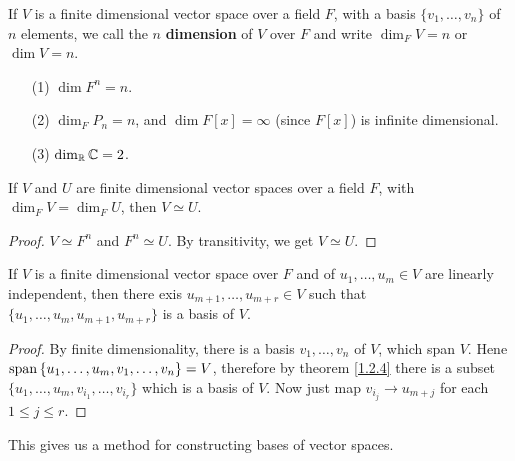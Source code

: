 \begin{definition}
    If $V$ is a finite dimensional vector space over a field  $F$, with a basis
     $\{v_1, \dots, v_n\}$ of $n$ elements, we call the $n$ \textbf{dimension} of
     $V$ over  $F$ and write $\dim_F{V}=n$ or $\dim{V}=n$.
\end{definition}

\begin{example}
    \begin{enumerate}
        \item[(1)] $\dim{F^n}=n$.

        \item[(2)] $\dim_F{P_n}=n$, and $\dim{F[x]}=\infty$ (since $F[x]$) is
            infinite dimensional.

        \item[(3)] $\dim_{\mathbb{R}}{\mathbb{C}}=2$.
    \end{enumerate}
\end{example} 

\begin{corollary}
    If $V$ and  $U$ are finite dimensional vector spaces over a field $F$, with
     $\dim_F{V}=\dim_F{U}$, then $V \simeq U$.
\end{corollary}
\begin{proof}
    $V \simeq F^n$ and  $F^n \simeq U$. By transitivity, we get  $V \simeq U$.
\end{proof}

\begin{lemma}
    If $V$ is a finite dimensional vector space over $F$ and of  $ u_1, \dots,
    u_m \in V$ are linearly independent, then there exis $u_{m+1}, \dots,
    u_{m+r} \in V$ such that $\{u_1, \dots, u_m, u_{m+1}, u_{m+r}\}$ is a basis
    of $V$.
\end{lemma}
\begin{proof}
    By finite dimensionality, there is a basis $ v_1, \dots, v_n$ of $V$, which
    span  $V$. Hene  $\operatorname{span}{\{u_1, \dots, u_m,v_1, \dots, v_n\}}=V$,
    therefore by theorem \ref {1.2.4} there is a subset $\{u_1, \dots,
    u_m,v_{i_1}, \dots, v_{i_r}\}$ which is a basis of $V$. Now just map
    $v_{i_j} \rightarrow u_{m+j}$ for each $1 \leq j \leq r$.
\end{proof}
\begin{remark} 
    This gives us a method for constructing bases of vector spaces.
\end{remark}

